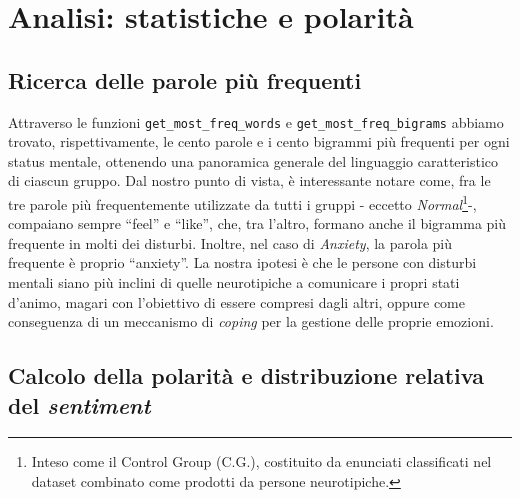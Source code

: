 \documentclass[11pt]{article}
\begin{document}
\section{Analisi: statistiche e polarità}
\subsection{Ricerca delle parole più frequenti}
\label{ssec:layout}

Attraverso le funzioni \texttt{get\_most\_freq\_words} e \texttt{get\_most\_freq\_bigrams} abbiamo trovato, rispettivamente, le cento parole e i cento bigrammi più frequenti per ogni status mentale, ottenendo una panoramica generale del linguaggio caratteristico di ciascun gruppo. Dal nostro punto di vista, è interessante notare come, fra le tre parole più frequentemente utilizzate da tutti i gruppi - eccetto \textit{Normal}\footnote{Inteso come il Control Group (C.G.), costituito da enunciati classificati nel dataset combinato come prodotti da persone neurotipiche.}-, compaiano sempre “feel” e “like”, che, tra l’altro, formano anche il bigramma più frequente in molti dei disturbi. Inoltre, nel caso di \textit{Anxiety}, la parola più frequente è proprio “anxiety”. La nostra ipotesi è che le persone con disturbi mentali siano più inclini di quelle neurotipiche a comunicare i propri stati d’animo, magari con l’obiettivo di essere compresi dagli altri, oppure come conseguenza di un meccanismo di \textit{coping} per la gestione delle proprie emozioni. 

\subsection{Calcolo della polarità e distribuzione relativa del \textit{sentiment}}
\label{ssec:first}
\end{document}
